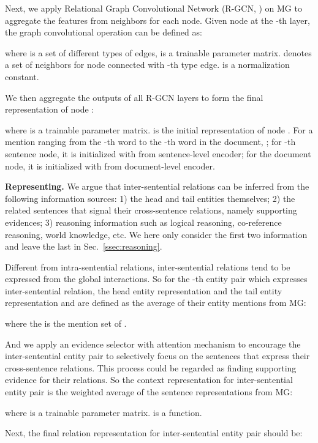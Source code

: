 \documentclass[11pt,a4paper]{article}
\begin{document}
Next, we apply Relational Graph Convolutional Network (R-GCN, \citealp{RGCN}) on MG to aggregate the features from neighbors for each node. Given node  at the -th layer, the graph convolutional operation can be defined as:

where  is a set of different types of edges,  is a trainable parameter matrix.
 denotes a set of neighbors for node  connected with -th type edge.  is a normalization constant.

We then aggregate the outputs of all R-GCN layers to form the final representation of node :

where  is a trainable parameter matrix.  is the initial representation of node . For a mention ranging from the -th word to the -th word in the document, ; for -th sentence node, it is initialized with  from sentence-level encoder; for the document node, it is initialized with  from document-level encoder.



\noindent
\textbf{Representing.} We argue that inter-sentential relations can be inferred from the following information sources: 1) the head and tail entities themselves; 2) the related sentences that signal their cross-sentence relations, namely supporting evidences; 3) reasoning information such as logical reasoning, co-reference reasoning, world knowledge, etc. We here only consider the first two information and leave the last in Sec.~\ref{ssec:reasoning}.

Different from intra-sentential relations, inter-sentential relations tend to be expressed from the global interactions. So for the -th entity pair  which expresses inter-sentential relation, the head entity representation  and the tail entity representation and  are defined as the average of their entity mentions from MG:

where the  is the mention set of .

And we apply an evidence selector with attention mechanism \citep{Attention} to encourage the inter-sentential entity pair to selectively focus on the sentences that express their cross-sentence relations. This process could be regarded as finding supporting evidence for their relations. So the context representation  for inter-sentential entity pair  is the weighted average of the sentence representations from MG:



where  is a trainable parameter matrix.  is a  function. 


Next, the final relation representation for inter-sentential entity pair  should be:
\end{document}
